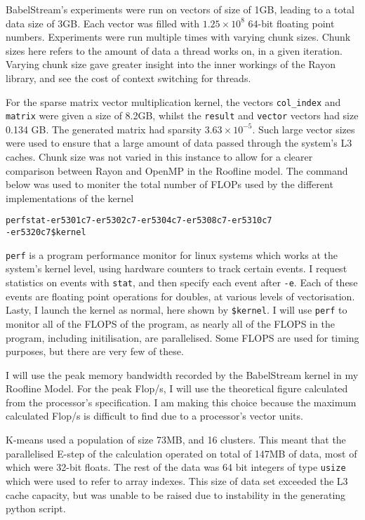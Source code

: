 BabelStream's experiments were run on vectors of size of 1GB, leading to a total data size of 3GB\@. Each vector was filled with $1.25\times10^8$ 64-bit floating point numbers. Experiments were run multiple times with varying chunk sizes. Chunk sizes here refers to the amount of data a thread works on, in a given iteration. Varying chunk size gave greater insight into the inner workings of the Rayon library, and see the cost of context switching for threads.

For the sparse matrix vector multiplication kernel, the vectors \texttt{col\_index} and \texttt{matrix} were given a size of 8.2GB, whilst the \texttt{result} and \texttt{vector} vectors had size 0.134 GB\@. The generated matrix had sparsity $3.63 \times 10^{-5}$. Such large vector sizes were used to ensure that a large amount of data passed through the system's L3 caches. Chunk size was not varied in this instance to allow for a clearer comparison between Rayon and OpenMP in the Roofline model. The command below was used to moniter the total number of FLOPs used by the different implementations of the kernel

\begin{alltt}
\footnotesize
perf stat -e r5301c7 -e r5302c7 -e r5304c7 -e r5308c7 -e r5310c7 
          -e r5320c7 \$kernel 
\end{alltt}

\texttt{perf} is a program performance monitor for linux systems which works at the system's kernel level, using hardware counters to track certain events. I request statistics on events with \texttt{stat}, and then specify each event after \texttt{-e}. Each of these events are floating point operations for doubles, at various levels of vectorisation. Lasty, I launch the kernel as normal, here shown by \texttt{\$kernel}.
I will use \texttt{perf} to monitor all of the FLOPS of the program, as nearly all of the FLOPS in the program, including initilisation, are parallelised. Some FLOPS are used for timing purposes, but there are very few of these.

I will use the peak memory bandwidth recorded by the BabelStream kernel in my Roofline Model. For the peak Flop/s, I will use the theoretical figure calculated from the processor's specification. I am making this choice because the maximum calculated Flop/s is difficult to find due to a processor's vector units.

K-means used a population of size 73MB, and 16 clusters. This meant that the parallelised E-step of the calculation operated on total of 147MB of data, most of which were 32-bit floats. The rest of the data was 64 bit integers of type \texttt{usize} which were used to refer to array indexes. This size of data set exceeded the L3 cache capacity, but was unable to be raised due to instability in the generating python script.

